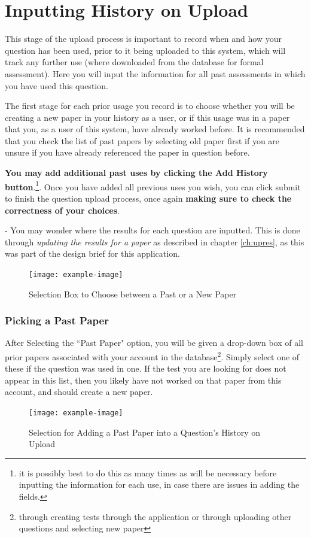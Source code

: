 \documentclass[12pt, a4paper, titlepage]{book}
\begin{document}
\section{Inputting History on Upload}
This stage of the upload process is important to record when and how your question has been used, prior to it being uploaded to this system, which will track any further use (where downloaded from the database for formal assessment). Here you will input the information for all past assessments in which you have used this question.\par
The first stage for each prior usage you record is to choose whether you will be creating a new paper  in your history as a user, or if this usage was in a paper that you, as a user of this system, have already worked before. It is recommended that you check the list of past papers by selecting old paper first if you are unsure if you have already referenced the paper in question before. \par
\textbf{You may add additional past uses by clicking the Add History button}.\footnote{it is possibly best to do this as many times as will be necessary before inputting the information for each use, in case there are issues in adding the fields.}. Once you have added all previous uses you wish, you can click submit to finish the question upload process, once again \textbf{making sure to check the correctness of your choices}.
\par - You may wonder where the results for each question are inputted. This is done through \textit{updating the results for a paper} as described in chapter \ref{ch:upres}, as this was part of the design brief for this application.
\begin{figure}[htp]
\centering
\texttt{[image: example-image]}
\caption{Selection Box to Choose between a Past or a New Paper}
\end{figure}
\pagebreak
\subsubsection{Picking a Past Paper}
After Selecting the ``Past Paper" option, you will be given a drop-down box of all prior papers associated with your account in the database\footnote{through creating tests through the application or through uploading other questions and selecting new paper}. Simply select one of these if the question was used in one. If the test you are looking for does not appear in this list, then you likely have not worked on that paper from this account, and should create a new paper.
\begin{figure}[H]
\centering
\texttt{[image: example-image]}
\caption{Selection for Adding a Past Paper into a Question's History on Upload}
\end{figure}
\end{document}

